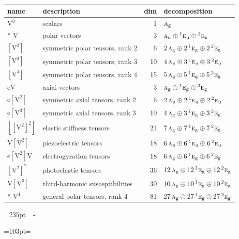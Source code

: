 \documentclass[10pt,a4paper]{article}
\newcommand{\needspace}[1]{\par\penalty-100\begingroup\dimen0=#1\relax\dimen2=\pagegoal
  \advance\dimen2-\pagetotal\ifdim\dimen0>\dimen2\relax\ifdim\dimen2>0pt\vfil\break\fi\fi
  \endgroup}
\numberwithin{equation}{section}
\newcommand{\irr}[1]{\text{\normalfont\scshape #1}}
\newcommand{\conjpair}[1]{{}^{#1}}
\newcommand{\ptag}[1]{\mathrm{#1}}
\newcommand{\jahn}[1]{\mathrm{#1}}
\newlength{\fillwidth}\newlength{\cellwidth}\newlength{\colwidth}
\begin{document}
{\begin{longtable}{@{}llr>{\RaggedRight\arraybackslash}p{\fillwidth}@{}}
name & description & dim & decomposition\\\midrule\endhead
\bottomrule\endfoot\endlastfoot
$\jahn{V^{0}}$ & scalars & 1 & $\irr{a}_{\ptag{g}}$\\*
$\jahn{V}$ & polar vectors & 3 & $\irr{a}_{\ptag{u}} \oplus\allowbreak \conjpair{1}\irr{e}_{\ptag{u}} \oplus\allowbreak \conjpair{2}\irr{e}_{\ptag{u}}$\\
$\jahn{[V^{2}]}$ & symmetric polar tensors, rank 2 & 6 & $2\,\irr{a}_{\ptag{g}} \oplus\allowbreak 2\,\conjpair{1}\irr{e}_{\ptag{g}} \oplus\allowbreak 2\,\conjpair{2}\irr{e}_{\ptag{g}}$\\
$\jahn{[V^{3}]}$ & symmetric polar tensors, rank 3 & 10 & $4\,\irr{a}_{\ptag{u}} \oplus\allowbreak 3\,\conjpair{1}\irr{e}_{\ptag{u}} \oplus\allowbreak 3\,\conjpair{2}\irr{e}_{\ptag{u}}$\\
$\jahn{[V^{4}]}$ & symmetric polar tensors, rank 4 & 15 & $5\,\irr{a}_{\ptag{g}} \oplus\allowbreak 5\,\conjpair{1}\irr{e}_{\ptag{g}} \oplus\allowbreak 5\,\conjpair{2}\irr{e}_{\ptag{g}}$\\
$\jahn{eV}$ & axial vectors & 3 & $\irr{a}_{\ptag{g}} \oplus\allowbreak \conjpair{1}\irr{e}_{\ptag{g}} \oplus\allowbreak \conjpair{2}\irr{e}_{\ptag{g}}$\\
$\jahn{e[V^{2}]}$ & symmetric axial tensors, rank 2 & 6 & $2\,\irr{a}_{\ptag{u}} \oplus\allowbreak 2\,\conjpair{1}\irr{e}_{\ptag{u}} \oplus\allowbreak 2\,\conjpair{2}\irr{e}_{\ptag{u}}$\\
$\jahn{e[V^{3}]}$ & symmetric axial tensors, rank 3 & 10 & $4\,\irr{a}_{\ptag{g}} \oplus\allowbreak 3\,\conjpair{1}\irr{e}_{\ptag{g}} \oplus\allowbreak 3\,\conjpair{2}\irr{e}_{\ptag{g}}$\\
$\jahn{[[V^{2}]^{2}]}$ & elastic stiffness tensors & 21 & $7\,\irr{a}_{\ptag{g}} \oplus\allowbreak 7\,\conjpair{1}\irr{e}_{\ptag{g}} \oplus\allowbreak 7\,\conjpair{2}\irr{e}_{\ptag{g}}$\\
$\jahn{V[V^{2}]}$ & piezoelectric tensors & 18 & $6\,\irr{a}_{\ptag{u}} \oplus\allowbreak 6\,\conjpair{1}\irr{e}_{\ptag{u}} \oplus\allowbreak 6\,\conjpair{2}\irr{e}_{\ptag{u}}$\\
$\jahn{e[V^{2}]V}$ & electrogyration tensors & 18 & $6\,\irr{a}_{\ptag{g}} \oplus\allowbreak 6\,\conjpair{1}\irr{e}_{\ptag{g}} \oplus\allowbreak 6\,\conjpair{2}\irr{e}_{\ptag{g}}$\\
$\jahn{[V^{2}]^{2}}$ & photoelastic tensors & 36 & $12\,\irr{a}_{\ptag{g}} \oplus\allowbreak 12\,\conjpair{1}\irr{e}_{\ptag{g}} \oplus\allowbreak 12\,\conjpair{2}\irr{e}_{\ptag{g}}$\\
$\jahn{V[V^{3}]}$ & third-harmonic susceptibilities & 30 & $10\,\irr{a}_{\ptag{g}} \oplus\allowbreak 10\,\conjpair{1}\irr{e}_{\ptag{g}} \oplus\allowbreak 10\,\conjpair{2}\irr{e}_{\ptag{g}}$\\*
$\jahn{V^{4}}$ & general polar tensors, rank 4 & 81 & $27\,\irr{a}_{\ptag{g}} \oplus\allowbreak 27\,\conjpair{1}\irr{e}_{\ptag{g}} \oplus\allowbreak 27\,\conjpair{2}\irr{e}_{\ptag{g}}$\\
\bottomrule\end{longtable}}
\needspace{235pt}
\needspace{103pt}
\end{document}
